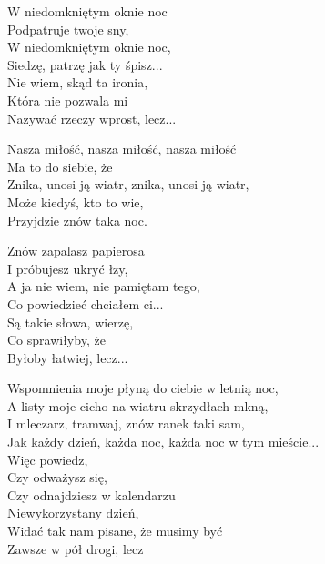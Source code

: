 \begin{text}
    W niedomkniętym oknie noc\\
    Podpatruje twoje sny,\\
    W niedomkniętym oknie noc,\\
    Siedzę, patrzę jak ty śpisz...\\
    Nie wiem, skąd ta ironia,\\
    Która nie pozwala mi\\
    Nazywać rzeczy wprost, lecz...

    \vin Nasza miłość, nasza miłość, nasza miłość\\
    \vin Ma to do siebie, że\\
    \vin Znika, unosi ją wiatr, znika, unosi ją wiatr,\\
    \vin Może kiedyś, kto to wie,\\
    \vin Przyjdzie znów taka noc.

    Znów zapalasz papierosa\\
    I próbujesz ukryć łzy,\\
    A ja nie wiem, nie pamiętam tego,\\
    Co powiedzieć chciałem ci...\\
    Są takie słowa, wierzę,\\
    Co sprawiłyby, że\\
    Byłoby łatwiej, lecz...

    Wspomnienia moje płyną do ciebie w letnią noc,\\
    A listy moje cicho na wiatru skrzydłach mkną,\\
    I mleczarz, tramwaj, znów ranek taki sam,\\
    Jak każdy dzień, każda noc, każda noc w tym mieście...\\
    \vin Więc powiedz,\\
    \vin Czy odważysz się,\\
    \vin Czy odnajdziesz w kalendarzu\\
    \vin Niewykorzystany dzień,\\
    \vin Widać tak nam pisane, że musimy być\\
    \vin Zawsze w pół drogi, lecz
\end{text}
